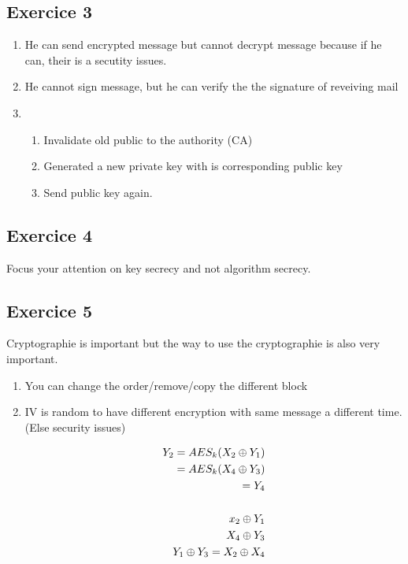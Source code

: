 \subsection{Exercice 3}
\begin{enumerate}
    \item He can send encrypted message but cannot decrypt message
        because if he can, their is a secutity issues.

    \item He cannot sign message, but he can verify the the signature of
        reveiving mail

    \item \begin{enumerate}
            \item Invalidate old public to the authority (CA)
            \item Generated a new private key with is corresponding public key
            \item Send public key again.
        \end{enumerate}
\end{enumerate}


\subsection{Exercice 4}
Focus your attention on key secrecy and not algorithm secrecy.

\subsection{Exercice 5}
Cryptographie is important but the way to use the cryptographie is also
very important.

\begin{enumerate}
    \item You can change the order/remove/copy the different block
    \item IV is random to have different encryption with same message a
        different time. (Else security issues)

        \begin{eqnarray*}
            Y_2 = AES_k (X_2 \oplus Y_1) \\
            = AES_k (X_4 \oplus Y_3) \\
            = Y_4 \\
            \\
            x_2 \oplus Y_1 \\
            X_4 \oplus Y_3 \\
            Y_1 \oplus Y_3 = X_2 \oplus X_4 \\
        \end{eqnarray*}
\end{enumerate}



